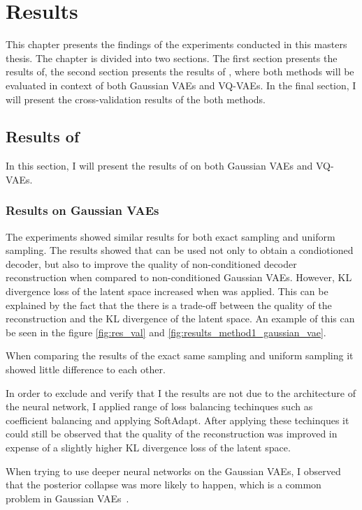 \chapter{Results}

This chapter presents the findings of the experiments conducted in this masters thesis. The chapter is divided into two sections.
The first section presents the results of, the second section presents the results of , where both methods will be evaluated in context of both Gaussian VAEs and VQ-VAEs. In the final section, I will present the cross-validation results of the both methods.

\section{Results of }

In this section, I will present the results of  on both Gaussian VAEs and VQ-VAEs.

\subsection{Results on Gaussian VAEs}

The experiments showed similar results for both exact sampling and uniform sampling. The results showed that  can be used not only to obtain a condiotioned decoder, but also to improve the quality of non-conditioned decoder reconstruction when compared to non-conditioned Gaussian VAEs. However, KL divergence loss of the latent space increased when  was applied. This can be explained by the fact that the there is a trade-off between the quality of the reconstruction and the KL divergence of the latent space. An example of this can be seen in the figure  \ref{fig:res_val} and \ref{fig:results_method1_gaussian_vae}. 

When comparing the results of the exact same sampling and uniform sampling it showed little difference to each other.

In order to exclude and verify that I the results are not due to the architecture of the neural network, I applied range of loss balancing techinques such as coefficient balancing and applying SoftAdapt. After applying these techinques it could still be observed that the quality of the reconstruction was improved in expense of a slightly higher KL divergence loss of the latent space.

When trying to use deeper neural networks on the Gaussian VAEs, I observed that the posterior collapse was more likely to happen, which is a common problem in Gaussian VAEs~\cite{wang2023posterior}.

